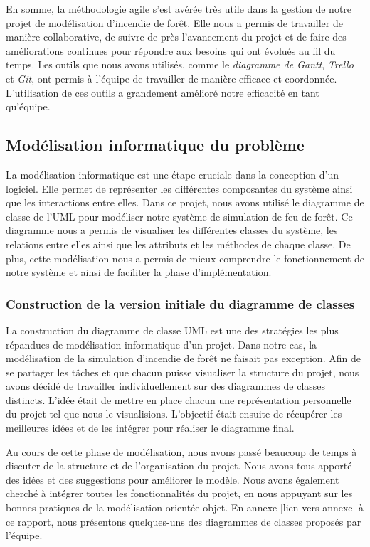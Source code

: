 En somme, la méthodologie agile s'est avérée très utile dans la gestion de notre projet de modélisation d'incendie de forêt. Elle nous a permis de travailler de manière collaborative, de suivre de près l'avancement du projet et de faire des améliorations continues pour répondre aux besoins qui ont évolués au fil du temps. Les outils que nous avons utilisés, comme le \textit{diagramme de Gantt}, \textit{Trello} et \textit{Git}, ont permis à l'équipe de travailler de manière efficace et coordonnée. L'utilisation de ces outils a grandement amélioré notre efficacité en tant qu'équipe.

\subsection{Modélisation informatique du problème}

La modélisation informatique est une étape cruciale dans la conception d'un logiciel. Elle permet de représenter les différentes composantes du système ainsi que les interactions entre elles. Dans ce projet, nous avons utilisé le diagramme de classe de l'UML pour modéliser notre système de simulation de feu de forêt. Ce diagramme nous a permis de visualiser les différentes classes du système, les relations entre elles ainsi que les attributs et les méthodes de chaque classe. De plus, cette modélisation nous a permis de mieux comprendre le fonctionnement de notre système et ainsi de faciliter la phase d'implémentation.

\subsubsection{Construction de la version initiale du diagramme de classes}

La construction du diagramme de classe UML est une des stratégies les plus répandues de modélisation informatique d’un projet. Dans notre cas, la modélisation de la simulation d'incendie de forêt ne faisait pas exception. Afin de se partager les tâches et que chacun puisse visualiser la structure du projet, nous avons décidé de travailler individuellement sur des diagrammes de classes distincts. L'idée était de mettre en place chacun une représentation personnelle du projet tel que nous le visualisions. L'objectif était ensuite de récupérer les meilleures idées et de les intégrer pour réaliser le diagramme final. 

Au cours de cette phase de modélisation, nous avons passé beaucoup de temps à discuter de la structure et de l'organisation du projet. Nous avons tous apporté des idées et des suggestions pour améliorer le modèle. Nous avons également cherché à intégrer toutes les fonctionnalités du projet, en nous appuyant sur les bonnes pratiques de la modélisation orientée objet. En annexe [lien vers annexe] à ce rapport, nous présentons quelques-uns des diagrammes de classes proposés par l’équipe.

